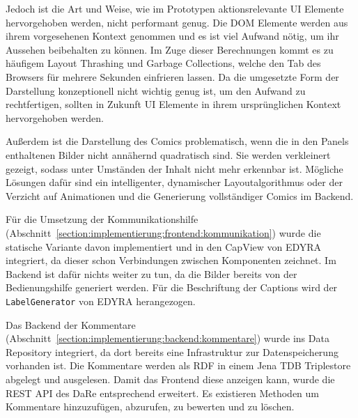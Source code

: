 \documentclass[
	headsepline,
	footsepline,
	fontsize=12pt,
	bibliography=totoc
]{scrbook}
\begin{document}
Jedoch ist die Art und Weise, wie im Prototypen aktionsrelevante UI Elemente hervorgehoben werden, nicht performant genug. Die DOM Elemente werden aus ihrem vorgesehenen Kontext genommen und es ist viel Aufwand nötig, um ihr Aussehen beibehalten zu können. Im Zuge dieser Berechnungen kommt es zu häufigem Layout Thrashing und Garbage Collections, welche den Tab des Browsers für mehrere Sekunden einfrieren lassen. Da die umgesetzte Form der Darstellung konzeptionell nicht wichtig genug ist, um den Aufwand zu rechtfertigen, sollten in Zukunft UI Elemente in ihrem ursprünglichen Kontext hervorgehoben werden.

Außerdem ist die Darstellung des Comics problematisch, wenn die in den Panels enthaltenen Bilder nicht annähernd quadratisch sind. Sie werden verkleinert gezeigt, sodass unter Umständen der Inhalt nicht mehr erkennbar ist. Mögliche Lösungen dafür sind ein intelligenter, dynamischer Layoutalgorithmus oder der Verzicht auf Animationen und die Generierung vollständiger Comics im Backend.


Für die Umsetzung der Kommunikationshilfe (Abschnitt~\ref{section:implementierung:frontend:kommunikation}) wurde die statische Variante davon implementiert und in den CapView von EDYRA integriert, da dieser schon Verbindungen zwischen Komponenten zeichnet. Im Backend ist dafür nichts weiter zu tun, da die Bilder bereits von der Bedienungshilfe generiert werden. Für die Beschriftung der Captions wird der \texttt{LabelGenerator} von EDYRA herangezogen.


Das Backend der Kommentare (Abschnitt~\ref{section:implementierung:backend:kommentare}) wurde ins Data Repository integriert, da dort bereits eine Infrastruktur zur Datenspeicherung vorhanden ist. Die Kommentare werden als RDF in einem Jena TDB Triplestore abgelegt und ausgelesen. Damit das Frontend diese anzeigen kann, wurde die REST API des DaRe entsprechend erweitert. Es existieren Methoden um Kommentare hinzuzufügen, abzurufen, zu bewerten und zu löschen.
\end{document}
